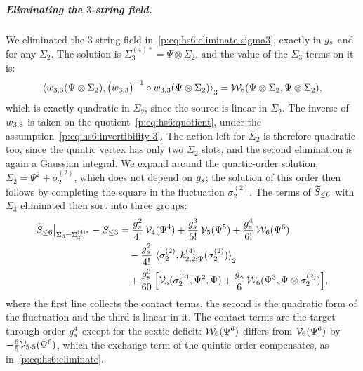 \subparagraph{Eliminating the $3$-string field.}

We eliminated the $3$-string field in~\eqref{p:eq:hs6:eliminate-sigma3}, exactly in $\gs$ and for any $\Sigma_2$.
The solution is $\Sigma_3^{(4)*} = \Psi \otimes \Sigma_2$, and the value of the $\Sigma_3$ terms on it is:
\begin{equation}
  \label{p:eq:hs7:sigma3-value}
    \pair[3]{\wprod{3}{3}(\Psi \otimes \Sigma_2)}{\big( \wprod{3}{3} \big)^{-1} \circ \wprod{3}{3}(\Psi \otimes \Sigma_2)}
    = \dvertex{6}(\Psi \otimes \Sigma_2, \Psi \otimes \Sigma_2),
\end{equation}
which is exactly quadratic in $\Sigma_2$, since the source is linear in $\Sigma_2$.
The inverse of $\wprod{3}{3}$ is taken on the quotient~\eqref{p:eq:hs6:quotient}, under the assumption~\eqref{p:eq:hs6:invertibility-3}.
The action left for $\Sigma_2$ is therefore quadratic too, since the quintic vertex has only two $\Sigma_2$ slots, and the second elimination is again a Gaussian integral.
We expand around the quartic-order solution, $\Sigma_2 = \Psi^2 + \sigma_2^{(2)}$, which does not depend on $\gs$; the solution of this order then follows by completing the square in the fluctuation $\sigma_2^{(2)}$.
The terms of $\caction[\le 6]$ with $\Sigma_3$ eliminated then sort into three groups:
\begin{subequations}
\label{p:eq:hs7:sigma2-groups}
\begin{align}
  \label{p:eq:hs7:sigma2-contact}
  \caction[\le 6] \big|_{\Sigma_3 = \Sigma_3^{(4)*}} - S_{\le 3}
    &
    = \frac{\gs^2}{4!} \, \vertex{4}(\Psi^4)
      + \frac{\gs^3}{5!} \, \vertex{5}(\Psi^5)
      + \frac{\gs^4}{6!} \, \dvertex{6}(\Psi^6)
  \\
  \label{p:eq:hs7:sigma2-quadratic}
  &
  \quad
  - \frac{\gs^2}{4!} \, \pair[2]{\sigma_2^{(2)}}{\kin{2}{\Psi}{4}(\sigma_2^{(2)})}
  \\
  \label{p:eq:hs7:sigma2-linear}
  &
  \quad
  + \frac{\gs^3}{60} \, \Big[
    \vertex{5}(\sigma_2^{(2)}, \Psi^2, \Psi)
    + \frac{\gs}{6} \, \dvertex{6}(\Psi^3, \Psi \otimes \sigma_2^{(2)})
  \Big],
\end{align}
\end{subequations}
where the first line collects the contact terms, the second is the quadratic form of the fluctuation and the third is linear in it.
The contact terms are the target through order $\gs^4$ except for the sextic deficit: $\dvertex{6}(\Psi^6)$ differs from $\vertex{6}(\Psi^6)$ by $- \tfrac{6}{5} \vertex{5 \cdot 5}(\Psi^6)$, which the exchange term of the quintic order compensates, as in~\eqref{p:eq:hs6:eliminate}.
